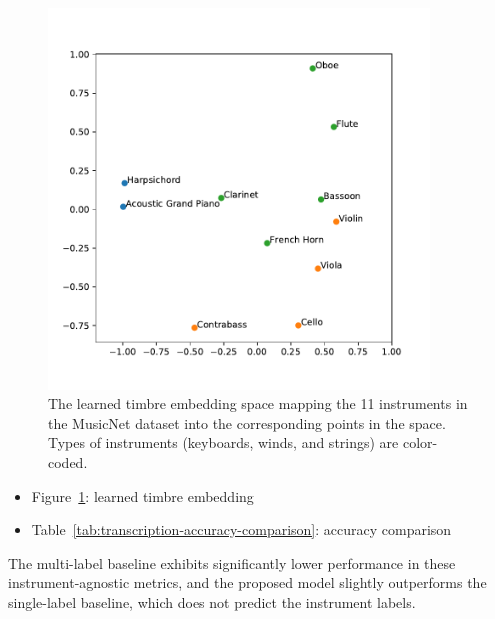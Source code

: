\begin{figure}
\centering
\includegraphics[width=0.9\textwidth]{cosine_distance.pdf}
\caption{The learned timbre embedding space mapping the 11 instruments in the MusicNet dataset into the corresponding points in the space. Types of instruments (keyboards, winds, and strings) are color-coded.}\label{fig:learned-timbre-embedding}
\end{figure}

\begin{itemize}
	\item Figure~\ref{fig:learned-timbre-embedding}: learned timbre embedding
	\item Table~\ref{tab:transcription-accuracy-comparison}: accuracy comparison
\end{itemize}

The multi-label baseline exhibits significantly lower performance in these instrument-agnostic metrics, and the proposed model slightly outperforms the single-label baseline, which does not predict the instrument labels.


